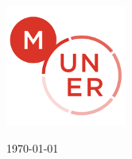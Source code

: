 \begin{titlepage}



\bigskip
\bigskip
\bigskip
\bigskip
\bigskip

\includegraphics[width=150px, keepaspectratio]{../Images/Muner.jpg}\\[1cm] %
 
\bigskip
\bigskip
\bigskip
\bigskip
\bigskip
\bigskip

{\large \today}\\[2cm] %

\vfill %

\end{titlepage}